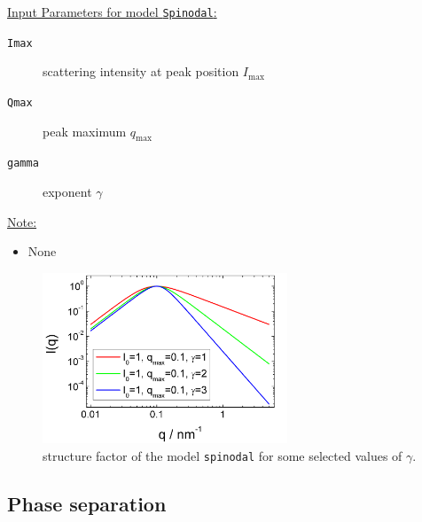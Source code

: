 \vspace{5mm}

\underline{Input Parameters for model \texttt{Spinodal}:}\\
\begin{description}
\item[\texttt{Imax}] scattering intensity at peak position $I_\text{max}$
\item[\texttt{Qmax}] peak maximum $q_\text{max}$
\item[\texttt{gamma}] exponent $\gamma$
\end{description}

\underline{Note:}
\begin{itemize}
\item None
\end{itemize}



\begin{figure}[htb]
\begin{center}
\end{center}
\includegraphics[width=0.65\textwidth]{spinodalIQ.png}
\caption{structure factor of the model \texttt{spinodal} for some selected values of $\gamma$.} \label{fig:phaseseparationIQ}
\end{figure}

\clearpage
\subsection{Phase separation}
\label{sect:phase separation}
~\\

